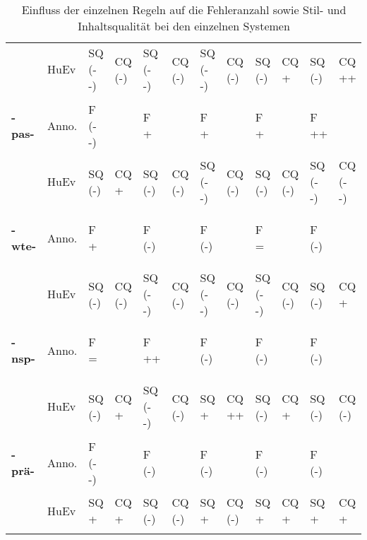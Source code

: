 \begin{table}
\begin{tabularx}{\textwidth}{llllllllllll}
& HuEv &	\cellcolor{lsLightGray}SQ (- -) &	CQ (-) &	\cellcolor{lsLightGray}SQ (- -)	& CQ (-) &	\cellcolor{lsLightGray}SQ (- -) &	CQ (-)	& SQ (-) &	CQ +	 & SQ (-) &	\cellcolor{lsLightGray}CQ ++\\
\tablevspace
\colorbox{smRed}{\textbf{-pas-}\strut}	& Anno. &	\cellcolor{lsLightGray}F (- -) & &		F +	& &	F +	& &	F +	 & &	\cellcolor{lsLightGray}F ++ &\\
& HuEv	& SQ (-) &	CQ + &	SQ (-) &	CQ (-) &	\cellcolor{lsLightGray}SQ (- -) &	CQ (-) &	SQ (-)	& CQ (-)	& \cellcolor{lsLightGray}SQ (- -)	& \cellcolor{lsLightGray}CQ (- -)\\
\tablevspace
\colorbox{smRed}{\textbf{-wte-}\strut} &	Anno.&	F +	& &	F (-)& 	&	F (-) & &		F =	& &	F (-)&\\
& HuEv &	SQ (-)	&CQ (-)&	\cellcolor{lsLightGray}SQ (- -)	&CQ (-)	&\cellcolor{lsLightGray}SQ (- -)	&CQ (-)&	\cellcolor{lsLightGray}SQ (- -)	&CQ (-)&	SQ (-)&	CQ +\\
\tablevspace
\colorbox{smYellow}{\textbf{-nsp-}\strut}&	Anno.&F =	& &	\cellcolor{lsLightGray}F ++	&\cellcolor{lsLightGray} &	F (-)	& &	F (-) & &		F (-)&\\
& HuEv &	SQ (-)	&CQ +	&\cellcolor{lsLightGray}SQ (- -)	&CQ (-)	&SQ +	&\cellcolor{lsLightGray}CQ ++	&SQ (-)	&CQ +	&SQ (-)	&CQ (-)\\
\tablevspace
\colorbox{smYellow}{\textbf{-prä-}\strut}	& Anno.&	\cellcolor{lsLightGray}F (- -) &	&	F (-) &	&	F (-)	& &	F (-)	& &	F (-) &\\
& HuEv &	SQ +	& CQ +	& SQ (-)	& CQ (-)&	SQ +	& CQ (-)&	SQ +	& CQ +	& SQ +	& CQ +\\
\lspbottomrule
\end{tabularx}
\caption{\label{tab:06:102}Einfluss der einzelnen Regeln auf die Fehleranzahl sowie Stil- und Inhaltsqualität bei den einzelnen Systemen}
\end{table}

